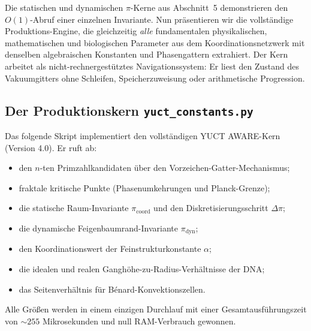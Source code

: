 \documentclass[12pt,a4paper]{article}
\begin{document}
	Die statischen und dynamischen $\pi$-Kerne aus Abschnitt~5 demonstrieren den $O(1)$-Abruf einer einzelnen Invariante. Nun präsentieren wir die vollständige Produktions-Engine, die gleichzeitig \emph{alle} fundamentalen physikalischen, mathematischen und biologischen Parameter aus dem Koordinationsnetzwerk mit denselben algebraischen Konstanten und Phasengattern extrahiert. Der Kern arbeitet als nicht-rechnergestütztes Navigationssystem: Er liest den Zustand des Vakuumgitters ohne Schleifen, Speicherzuweisung oder arithmetische Progression.
	
	\subsection{Der Produktionskern \texttt{yuct\_constants.py}}
	
	Das folgende Skript implementiert den vollständigen YUCT AWARE-Kern (Version 4.0). Er ruft ab:
	\begin{itemize}
		\item den $n$-ten Primzahlkandidaten über den Vorzeichen-Gatter-Mechanismus;
		\item fraktale kritische Punkte (Phasenumkehrungen und Planck-Grenze);
		\item die statische Raum-Invariante $\pi_{\mathrm{coord}}$ und den Diskretisierungsschritt $\Delta\pi$;
		\item die dynamische Feigenbaumrand-Invariante $\pi_{\mathrm{dyn}}$;
		\item den Koordinationswert der Feinstrukturkonstante $\alpha$;
		\item die idealen und realen Ganghöhe-zu-Radius-Verhältnisse der DNA;
		\item das Seitenverhältnis für Bénard-Konvektionszellen.
	\end{itemize}
	Alle Größen werden in einem einzigen Durchlauf mit einer Gesamtausführungszeit von $\sim 255$ Mikrosekunden und null RAM-Verbrauch gewonnen.
	
\end{document}
